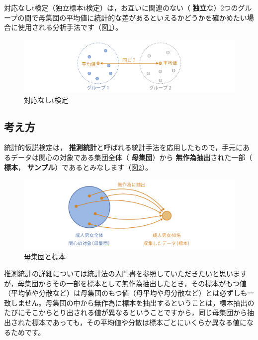 \documentclass[
  12pt,
  a5jpaper,
  lualatex, ja=standard]{bxjsbook}
\renewcommand{\emph}[1]{\textbf{\color{emph} #1}}
\begin{document}
対応なしt検定（独立標本t検定）は，お互いに関連のない（\emph{独立}な）2つのグループの間で母集団の平均値に統計的な差があるといえるかどうかを確かめたい場合に使用される分析手法です（図\ref{fig:ttests-independent-t}）。

\begin{figure}[!ht]

{\centering \includegraphics[width=1\linewidth]{images/ttests/independent-t} 

}

\caption{対応なしt検定}\label{fig:ttests-independent-t}
\end{figure}

\hypertarget{subsec:ttests-independent-basics}{%
\subsection{考え方}\label{subsec:ttests-independent-basics}}

統計的仮説検定は，\emph{推測統計}と呼ばれる統計手法を応用したもので，手元にあるデータは関心の対象である集団全体（\emph{母集団}）から\emph{無作為抽出}された一部（\emph{標本}，\emph{サンプル}）であるとみなします（図\ref{fig:ttests-population-sample}）。

\begin{figure}[!ht]

{\centering \includegraphics[width=1\linewidth]{images/ttests/population-sample} 

}

\caption{母集団と標本}\label{fig:ttests-population-sample}
\end{figure}

推測統計の詳細については統計法の入門書を参照していただきたいと思いますが，母集団からその一部を標本として無作為抽出したとき，その標本がもつ値（平均値や分散など）は母集団のもつ値（母平均や母分散など）とは必ずしも一致しません。母集団の中から無作為に標本を抽出するということは，標本抽出のたびにそこからとり出される値が異なるということですから，同じ母集団から抽出された標本であっても，その平均値や分散は標本ごとにいくらか異なる値になるためです。
\end{document}
